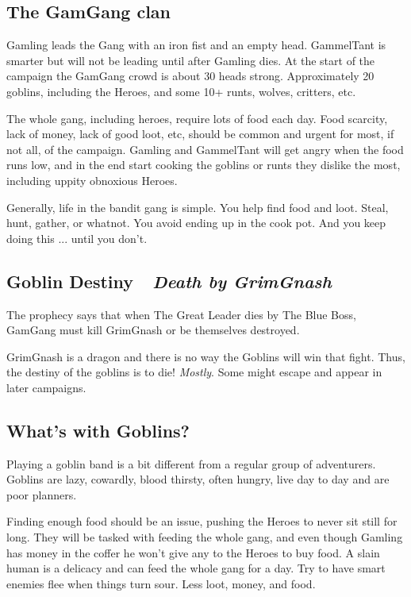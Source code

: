 \subsection*{The GamGang clan}

Gamling leads the Gang with an iron fist and an empty head. GammelTant is smarter but will not be leading until after Gamling dies.
At the start of the campaign the GamGang crowd is about 30 heads strong. Approximately 20 goblins, including the Heroes, and some 10+ runts, wolves, critters, etc.

The whole gang, including heroes, require lots of food each day. Food scarcity, lack of money, lack of good loot, etc, should be common and urgent for most, if not all, of the campaign. Gamling and GammelTant will get angry when the food runs low, and in the end start cooking the goblins or runts they dislike the most, including uppity obnoxious Heroes.

Generally, life in the bandit gang is simple. You help find food and loot. Steal, hunt, gather, or whatnot. You avoid ending up in the cook pot. And you keep doing this ... until you don't.


\subsection*{Goblin Destiny~\mdash~\emph{Death by GrimGnash}}   %

The prophecy says that when The Great Leader dies by The Blue Boss, GamGang must kill GrimGnash or be themselves destroyed.

GrimGnash is a dragon and there is no way the Goblins will win that fight. Thus, the destiny of the goblins is to die! \emph{Mostly}. Some might escape and appear in later campaigns.


\subsection*{What's with Goblins?}

Playing a goblin band is a bit different from a regular group of adventurers. Goblins are lazy, cowardly, blood thirsty, often hungry, live day to day and are poor planners.

Finding enough food should be an issue, pushing the Heroes to never sit still for long. They will be tasked with feeding the whole gang, and even though Gamling has money in the coffer he won't give any to the Heroes to buy food. A slain human is a delicacy and can feed the whole gang for a day. Try to have smart enemies flee when things turn sour. Less loot, money, and food. 

